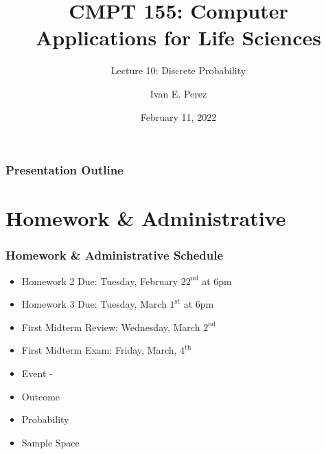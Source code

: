 \documentclass[12pt]{beamer}
\title{CMPT 155: Computer Applications for Life Sciences}
\subtitle{Lecture 10: Discrete Probability}
\author{Ivan E. Perez}
\institute{}
\date{February 11, 2022}
\begin{document}
	
	\begin{frame}
		\titlepage
	\end{frame}
	
	\begin{frame}
		\frametitle{Presentation Outline}
		\tableofcontents
	\end{frame}
	\section{Homework \& Administrative}
	
	\begin{frame}
		\frametitle{Homework \& Administrative Schedule}
		\begin{itemize}
			\item Homework 2 Due: Tuesday, February $22^{\text{nd}}$ at 6pm
			\item Homework 3 Due: Tuesday, March $1^{\text{st}}$ at 6pm
			\item First Midterm Review:  Wednesday, March $2^{\text{nd}}$
			\item First Midterm Exam: Friday, March, $4^{\text{th}}$
			
		\end{itemize}
	\end{frame}
	\begin{frame}
		\begin{itemize}
			\item Event - 
			\item Outcome 
			\item Probability
			\item Sample Space 
		\end{itemize}	
	\end{frame}		
\end{document}

